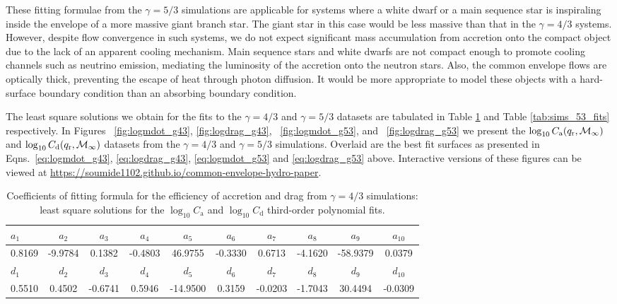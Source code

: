 These fitting formulae from the $\gamma = 5/3$ simulations are applicable for systems where a white dwarf or a main sequence star is inspiraling inside the envelope of a more massive giant branch star. The giant star in this case would be less massive than that in the $\gamma = 4/3$ systems. However, despite flow convergence in such systems, we do not expect significant mass accumulation from accretion onto the compact object due to the lack of an apparent cooling mechanism. Main sequence stars and white dwarfs are not compact enough to promote cooling channels such as neutrino emission, mediating the luminosity of the accretion onto the neutron stars. Also, the common envelope flows are optically thick, preventing the escape of heat through photon diffusion. It would be more appropriate to model these objects with a hard-surface boundary condition than an absorbing boundary condition.

The least square solutions we obtain for the fits to the $\gamma = 4/3$ and $\gamma = 5/3$ datasets are tabulated in Table \ref{tab:sims_43_fits} and Table \ref{tab:sims_53_fits} respectively. In Figures ~\ref{fig:logmdot_g43}, \ref{fig:logdrag_g43}, ~\ref{fig:logmdot_g53}, and ~\ref{fig:logdrag_g53} we present the $\log_{10}C_{\mathrm a} (q_{\rm r}, \mathcal{M}_\infty)$ and $\log_{10}C_{\mathrm d} (q_{\rm r}, \mathcal{M}_\infty)$ datasets from the $\gamma = 4/3$ and $\gamma = 5/3$ simulations. Overlaid are the best fit surfaces as presented in Eqns.~\ref{eq:logmdot_g43}, \ref{eq:logdrag_g43}, \ref{eq:logmdot_g53} and \ref{eq:logdrag_g53} above. Interactive versions of these figures can be viewed at \url{https://soumide1102.github.io/common-envelope-hydro-paper}.

\begin{table}[h]
\centering
\begin{adjustwidth}{-1.5cm}{}
\begin{tabular}{lccccccccc} 
\hline\hline
\rule{0pt}{3ex}
$a_1$ & $a_2$ & $a_3$ & $a_4$ & $a_5$ & $a_6$ & $a_7$ & $a_8$ & $a_9$ & $a_{10}$ \\
\hline
\rule{0pt}{3ex}%
\vspace*{0.1cm}
0.8169 & -9.9784 & 0.1382 & -0.4803 & 46.9755 & -0.3330 & 0.6713 & -4.1620 & -58.9379 & 0.0379 \\
\hline\hline
\rule{0pt}{3ex}
$d_1$ & $d_2$ & $d_3$ & $d_4$ & $d_5$ & $d_6$ & $d_7$ & $d_8$ & $d_9$ & $d_{10}$ \\
\hline
\rule{0pt}{3ex}%
\vspace*{0.1cm}
0.5510 & 0.4502 & -0.6741 & 0.5946 & -14.9500 & 0.3159 & -0.0203 & -1.7043 & 30.4494 & -0.0309 \\
\hline
\end{tabular}
\caption{Coefficients of fitting formula for the efficiency of accretion and drag from $\gamma = 4/3$ simulations: least square solutions for the $\log_{10} C_{\mathrm a}$ and $\log_{10} C_{\mathrm d}$ third-order polynomial fits.}
\label{tab:sims_43_fits}
\end{adjustwidth}
\end{table}

